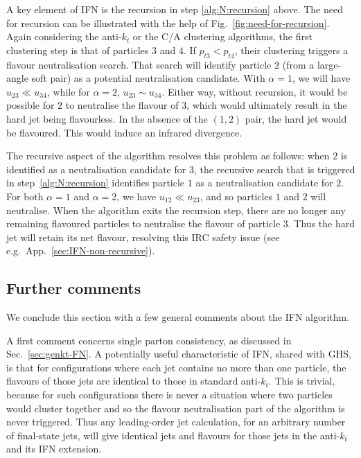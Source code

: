 \documentclass[nofootinbib,twocolumn,preprintnumbers,superscriptaddress,aps]{revtex4-2}
\begin{document}
A key element of IFN is the recursion in step \ref{alg:N:recursion} above.
%
The need for recursion can be illustrated with the help of
Fig.~\ref{fig:need-for-recursion}.
%
Again considering the anti-$k_t$ or the C/A clustering algorithms, the
first clustering step is that of particles $3$ and $4$.
%
If $p_{t3} < p_{t4}$, their clustering triggers a flavour
neutralisation search.
%
That search will identify particle $2$ (from a large-angle soft pair)
as a potential neutralisation candidate.
%
With $\alpha=1$, we will have $u_{23} \ll u_{34}$, while for
$\alpha=2$, $u_{23} \sim u_{34}$.
%
Either way, without recursion, it would be possible for $2$ to
neutralise the flavour of $3$, which would ultimately result in the
hard jet being flavourless.
%
In the absence of the $(1,2)$ pair, the hard jet would be flavoured.
%
This would induce an infrared divergence.

The recursive aspect of the algorithm resolves this problem as
follows: when $2$ is identified as a neutralisation candidate for $3$,
the recursive search that is triggered in step~\ref{alg:N:recursion}
identifies particle $1$ as a 
neutralisation candidate for $2$.
%
For both $\alpha=1$ and $\alpha=2$, we have $u_{12} \ll u_{23}$,
and so particles $1$ and $2$ will neutralise.
%
When the algorithm exits the recursion step, there are no longer any
remaining flavoured particles to neutralise the flavour of particle
$3$.
%
Thus the hard jet will retain its net flavour, resolving this IRC
safety issue (see e.g.\ App.~\ref{sec:IFN-non-recursive}).

\subsection{Further comments}

We conclude this section with a few general comments about the IFN algorithm.

A first comment concerns single parton consistency, as discussed in Sec.~\ref{sec:genkt-FN}.
%
A potentially useful characteristic of IFN, shared with GHS, is that for
configurations where each jet contains no more than one particle, the
flavours of those jets are identical to those in standard anti-$k_t$.
%
This is trivial, because for such configurations there is never a
situation where two particles would cluster together and so the
flavour neutralisation part of the algorithm is never triggered.
%
Thus any leading-order jet calculation, for an arbitrary number of
final-state jets, will give identical jets and flavours for those jets
in the anti-$k_t$ and its IFN extension.
\end{document}
